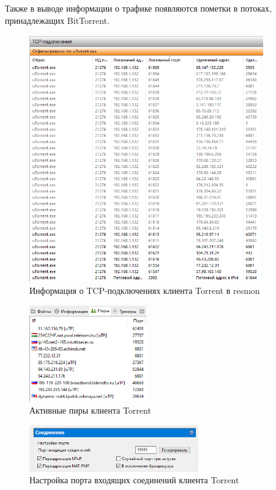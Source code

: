 \documentclass[bachelor, och, coursework]{SCWorks}
\begin{document}
Также в выводе информации о трафике появляются пометки в потоках, принадлежащих BitTorrent.

\begin{figure}[H]
    \centering
    \includegraphics[width=0.9\textwidth]{test2_resmon.png}
    \caption{Информация о TCP-подключениях клиента \textmu Torrent в resmon}
    \label{test2_resmon}
\end{figure}

\begin{figure}[H]
    \centering
    \includegraphics[width=0.45\textwidth]{test2_peers.png}
    \caption{Активные пиры клиента \textmu Torrent}
    \label{test2_peers}
\end{figure}

\begin{figure}[H]
    \centering
    \includegraphics[width=0.65\textwidth]{test2_btset.png}
    \caption{Настройка порта входящих соединений клиента \textmu Torrent}
    \label{test2_btset}
\end{figure}
\end{document}
